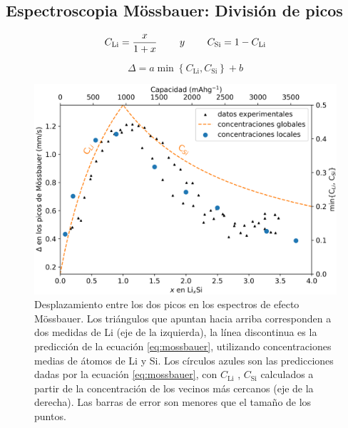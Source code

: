 \subsection{Espectroscopia Mössbauer: División de picos}

\begin{equation}\label{eq:C}
    C_{\text{Li}} = \frac{x}{1+x} \hspace{0.8cm}y \hspace{0.8cm}  C_{\text{Si}} = 1 - C_{\text{Li}}
\end{equation}

\begin{equation}\label{eq:mossbauer}
    \Delta = a\min\left\lbrace C_{\text{Li}},C_{\text{Si}}\right\rbrace + b
\end{equation}

\begin{figure}[h!]
    \centering
    \includegraphics[width=.7\textwidth]{Silicio/prediccion/resultados/mossbauer/mossbauer.png}
    \caption{Desplazamiento entre los dos picos en los espectros de efecto 
    Mössbauer. Los triángulos que apuntan hacia arriba corresponden a dos 
    medidas de Li  (eje de la izquierda), la línea discontinua es la 
    predicción de la ecuación \ref{eq:mossbauer}, utilizando concentraciones 
    medias de átomos de Li y Si. Los círculos azules son las predicciones dadas 
    por la ecuación \ref{eq:mossbauer}, con $C_{\text{Li}}$ , $C_{\text{Si}}$ 
    calculados a partir de la concentración de los vecinos más cercanos (eje de 
    la derecha). Las barras de error son menores que el tamaño de los puntos.}
    \label{fig:mossbauer}
\end{figure}
